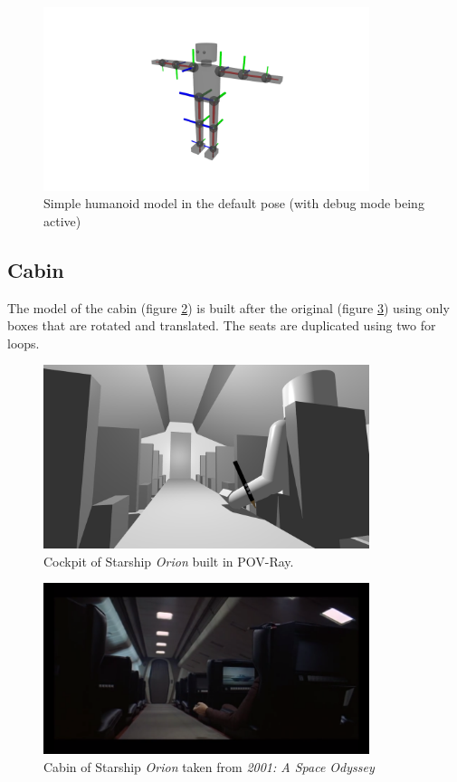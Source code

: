\begin{figure}[ht]
	\centering
	\includegraphics[width=0.85\textwidth]{images/human.png}
	\caption{Simple humanoid model in the default pose (with debug mode being active)}
	\label{fig_human}
\end{figure}

\subsection{Cabin}

The model of the cabin (figure \ref{cabin}) is built after the original (figure \ref{cabin_original}) using only boxes that are rotated and translated. The seats are duplicated using two for loops.

\begin{figure}[ht]
	\centering
	\includegraphics[width=0.85\textwidth]{images/cabin.png}
	\caption{Cockpit of Starship \textit{Orion} built in POV-Ray.}
	\label{cabin}
\end{figure}

\begin{figure}[ht]
	\centering
	\includegraphics[width=0.85\textwidth]{images/cabin_original.png}
	\caption{Cabin of Starship \textit{Orion} taken from \textit{2001: A Space Odyssey}}
	\label{cabin_original}
\end{figure}

